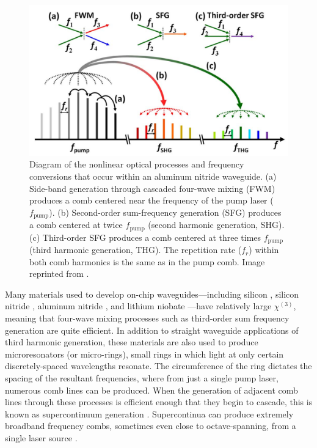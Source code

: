 \begin{figure}
    \centering
    \includegraphics[width=\textwidth]{figures-3/nonlinearity.png}
    \caption[Alumninum nitride frequency conversion diagram]{Diagram of the nonlinear optical processes and frequency conversions that occur within an aluminum nitride waveguide. (a) Side-band generation through cascaded four-wave mixing (FWM) produces a comb centered near the frequency of the pump laser ($f_\mathrm{pump}$). (b) Second-order sum-frequency generation (SFG) produces a comb centered at twice $f_\mathrm{pump}$ (second harmonic generation, SHG). (c) Third-order SFG produces a comb centered at three times $f_\mathrm{pump}$ (third harmonic generation, THG). The repetition rate ($f_r$) within both comb harmonics is the same as in the pump comb. Image reprinted from \cite{jung_green_2014}.}
    \label{fig:nonlinearity}
\end{figure}

Many materials used to develop on-chip waveguides---including silicon \citep{leuthold_nonlinear_2010}, silicon nitride \citep{moss_new_2013}, aluminum nitride \citep{jung_aluminum_2016}, and lithium niobate \citep{zhang_monolithic_2017}---have relatively large $\chi^{(3)}$, meaning that four-wave mixing processes such as third-order sum frequency generation are quite efficient. In addition to straight waveguide applications of third harmonic generation, these materials are also used to produce microresonators (or micro-rings), small rings in which light at only certain discretely-spaced wavelengths resonate. The circumference of the ring dictates the spacing of the resultant frequencies, where from just a single pump laser, numerous comb lines can be produced. When the generation of adjacent comb lines through these processes is efficient enough that they begin to cascade, this is known as supercontinuum generation \citep{dudley_supercontinuum_2006}. Supercontinua can produce extremely broadband frequency combs, sometimes even close to octave-spanning, from a single laser source \citep{li_stably_2017, gong_near-octave_2020}.

